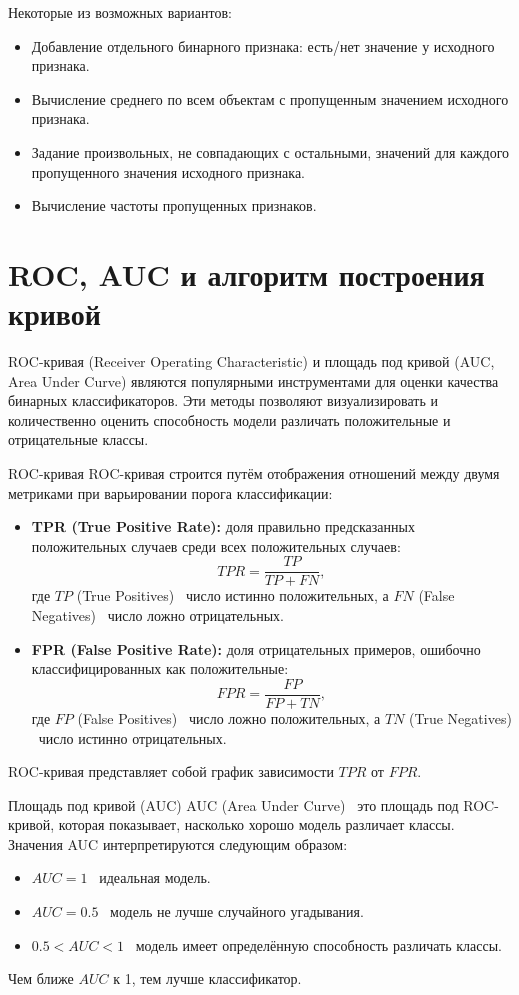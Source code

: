 Некоторые из возможных вариантов:
\begin{itemize}
	\item Добавление отдельного бинарного признака: есть/нет значение у исходного признака.
	\item Вычисление среднего по всем объектам с пропущенным значением исходного признака.
	\item Задание произвольных, не совпадающих с остальными, значений для каждого пропущенного значения исходного признака.
	\item Вычисление частоты пропущенных признаков.
\end{itemize}




\section*{ROC, AUC и алгоритм построения кривой}

ROC-кривая (Receiver Operating Characteristic) и площадь под кривой (AUC, Area Under Curve) являются популярными инструментами для оценки качества бинарных классификаторов. Эти методы позволяют визуализировать и количественно оценить способность модели различать положительные и отрицательные классы.

ROC-кривая
ROC-кривая строится путём отображения отношений между двумя метриками при варьировании порога классификации:
\begin{itemize}
    \item \textbf{TPR (True Positive Rate):} доля правильно предсказанных положительных случаев среди всех положительных случаев:
    \[
    TPR = \frac{TP}{TP + FN},
    \]
    где $TP$ (True Positives) \textendash\ число истинно положительных, а $FN$ (False Negatives) \textendash\ число ложно отрицательных.
    \item \textbf{FPR (False Positive Rate):} доля отрицательных примеров, ошибочно классифицированных как положительные:
    \[
    FPR = \frac{FP}{FP + TN},
    \]
    где $FP$ (False Positives) \textendash\ число ложно положительных, а $TN$ (True Negatives) \textendash\ число истинно отрицательных.
\end{itemize}
ROC-кривая представляет собой график зависимости $TPR$ от $FPR$.

Площадь под кривой (AUC)
AUC (Area Under Curve) \textendash\ это площадь под ROC-кривой, которая показывает, насколько хорошо модель различает классы. Значения AUC интерпретируются следующим образом:
\begin{itemize}
    \item $AUC = 1$ \textendash\ идеальная модель.
    \item $AUC = 0.5$ \textendash\ модель не лучше случайного угадывания.
    \item $0.5 < AUC < 1$ \textendash\ модель имеет определённую способность различать классы.
\end{itemize}
Чем ближе $AUC$ к 1, тем лучше классификатор.


